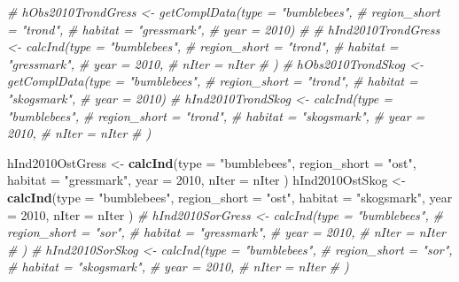 \documentclass[]{article}
\newenvironment{Shaded}{\begin{snugshade}}{\end{snugshade}}
\newcommand{\KeywordTok}[1]{\textcolor[rgb]{0.13,0.29,0.53}{\textbf{#1}}}
\newcommand{\DataTypeTok}[1]{\textcolor[rgb]{0.13,0.29,0.53}{#1}}
\newcommand{\DecValTok}[1]{\textcolor[rgb]{0.00,0.00,0.81}{#1}}
\newcommand{\StringTok}[1]{\textcolor[rgb]{0.31,0.60,0.02}{#1}}
\newcommand{\CommentTok}[1]{\textcolor[rgb]{0.56,0.35,0.01}{\textit{#1}}}
\newcommand{\NormalTok}[1]{#1}
\begin{document}
\begin{Shaded}
\begin{Highlighting}[]
\CommentTok{# hObs2010TrondGress <- getComplData(type = "bumblebees",}
\CommentTok{#                                    region_short = "trond",}
\CommentTok{#                                    habitat = "gressmark",}
\CommentTok{#                                    year = 2010)}
\CommentTok{# }
\CommentTok{# hInd2010TrondGress <- calcInd(type = "bumblebees",}
\CommentTok{#                               region_short = "trond",}
\CommentTok{#                               habitat = "gressmark",}
\CommentTok{#                               year = 2010,}
\CommentTok{#                               nIter = nIter}
\CommentTok{#                               )}
\CommentTok{# hObs2010TrondSkog <- getComplData(type = "bumblebees",}
\CommentTok{#                                    region_short = "trond",}
\CommentTok{#                                    habitat = "skogsmark",}
\CommentTok{#                                    year = 2010)}
\CommentTok{# hInd2010TrondSkog <- calcInd(type = "bumblebees",}
\CommentTok{#                               region_short = "trond",}
\CommentTok{#                               habitat = "skogsmark",}
\CommentTok{#                               year = 2010,}
\CommentTok{#                               nIter = nIter}
\CommentTok{#                               )}

\NormalTok{hInd2010OstGress <-}\StringTok{ }\KeywordTok{calcInd}\NormalTok{(}\DataTypeTok{type =} \StringTok{"bumblebees"}\NormalTok{,}
                              \DataTypeTok{region_short =} \StringTok{"ost"}\NormalTok{,}
                              \DataTypeTok{habitat =} \StringTok{"gressmark"}\NormalTok{,}
                              \DataTypeTok{year =} \DecValTok{2010}\NormalTok{,}
                              \DataTypeTok{nIter =}\NormalTok{ nIter}
\NormalTok{                              )}
\NormalTok{hInd2010OstSkog <-}\StringTok{ }\KeywordTok{calcInd}\NormalTok{(}\DataTypeTok{type =} \StringTok{"bumblebees"}\NormalTok{,}
                              \DataTypeTok{region_short =} \StringTok{"ost"}\NormalTok{,}
                              \DataTypeTok{habitat =} \StringTok{"skogsmark"}\NormalTok{,}
                              \DataTypeTok{year =} \DecValTok{2010}\NormalTok{,}
                              \DataTypeTok{nIter =}\NormalTok{ nIter}
\NormalTok{                              )}
\CommentTok{# hInd2010SorGress <- calcInd(type = "bumblebees",}
\CommentTok{#                               region_short = "sor",}
\CommentTok{#                               habitat = "gressmark",}
\CommentTok{#                               year = 2010,}
\CommentTok{#                               nIter = nIter}
\CommentTok{#                               )}
\CommentTok{# hInd2010SorSkog <- calcInd(type = "bumblebees",}
\CommentTok{#                               region_short = "sor",}
\CommentTok{#                               habitat = "skogsmark",}
\CommentTok{#                               year = 2010,}
\CommentTok{#                               nIter = nIter}
\CommentTok{#                               )}


\end{Highlighting}
\end{Shaded}
\end{document}
